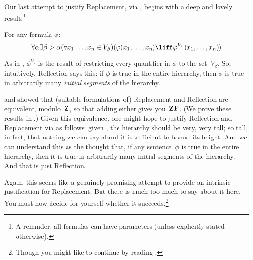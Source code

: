 \documentclass[../../../include/open-logic-section]{subfiles}
\begin{document}

Our last attempt to justify Replacement, via \stagesinex, begins with a deep and lovely result:\footnote{A reminder: all formulas can have parameters (unless explicitly stated otherwise).}
\begin{thm}
For any formula $\phi$:
\[
\forall \alpha \exists \beta > \alpha (\forall x_1 \ldots, x_n \in
V_\beta)(\phi(x_1, \ldots, x_n) \liff \phi^{V_\beta}(x_1, \ldots, x_n))
\]
\end{thm}
\noindent 
As in , $\phi^{V_\beta}$ is the result of restricting every
quantifier in $\phi$ to the set~$V_\beta$. So, intuitively, Reflection
says this: if $\phi$ is true in the entire hierarchy, then $\phi$ is
true in arbitrarily many \emph{initial segments} of the hierarchy. 

\citet{Montague1961} and \citet{Levy1960} showed that (suitable
formulations of) Replacement and Reflection are equivalent,
modulo~$\mathbf{Z}$, so that adding either gives you~$\mathbf{ZF}$. (We prove these results in .) Given this
equivalence, one might hope to justify Reflection  and Replacement via
\stagesinex{} as follows: given \stagesinex, the hierarchy should be
very, very tall; so tall, in fact, that nothing we can say about it is
sufficient to bound its height. And we can understand this as the
thought that, if any sentence~$\phi$ is true in the entire hierarchy,
then it is true in arbitrarily many initial segments of the hierarchy.
And that is just Reflection. 

Again, this seems like a genuinely promising attempt to provide an
intrinsic justification for Replacement. But there is much too much to
say about it here. You must now decide for yourself whether it
succeeds.\footnote{Though you might like to continue by reading \citet[95--100]{Incurvati2020}.}
\end{document}
